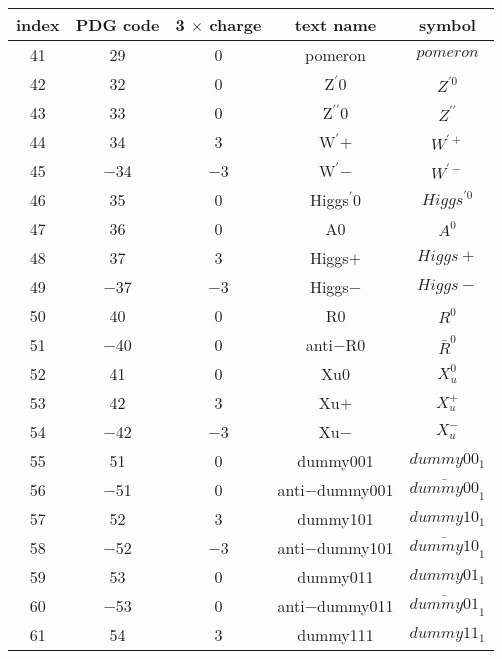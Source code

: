 \documentclass{article}
\begin{document}
\begin{table}[!htbp]
\centering
\begin{tabular}{|c|c|c|c|c|}
\hline
index & PDG code & 3 $\times$ charge & text name & symbol \\
\hline
41 & 29 & 0 & pomeron & $pomeron$ \\
\hline
42 & 32 & 0 & Z$^{\prime}$0 & $Z^{\prime0}$ \\
\hline
43 & 33 & 0 & Z$^{\prime\prime}$0 & $Z^{\prime\prime}$ \\
\hline
44 & 34 & 3 & W$^{\prime}$$+$ & $W^{\prime+}$ \\
\hline
45 & $-$34 & $-$3 & W$^{\prime}$$-$ & $W^{\prime-}$ \\
\hline
46 & 35 & 0 & Higgs$^{\prime}$0 & $Higgs^{\prime0}$ \\
\hline
47 & 36 & 0 & A0 & $A^{0}$ \\
\hline
48 & 37 & 3 & Higgs$+$ & $Higgs+$ \\
\hline
49 & $-$37 & $-$3 & Higgs$-$ & $Higgs-$ \\
\hline
50 & 40 & 0 & R0 & $R^{0}$ \\
\hline
51 & $-$40 & 0 & anti$-$R0 & $\bar{R}^{0}$ \\
\hline
52 & 41 & 0 & Xu0 & $X_{u}^{0}$ \\
\hline
53 & 42 & 3 & Xu$+$ & $X_{u}^{+}$ \\
\hline
54 & $-$42 & $-$3 & Xu$-$ & $X_{u}^{-}$ \\
\hline
55 & 51 & 0 & dummy00\underline{\hspace{0.6em}}1 & $dummy00_{1}$ \\
\hline
56 & $-$51 & 0 & anti$-$dummy00\underline{\hspace{0.6em}}1 & $\bar{dummy00}_{1}$ \\
\hline
57 & 52 & 3 & dummy10\underline{\hspace{0.6em}}1 & $dummy10_{1}$ \\
\hline
58 & $-$52 & $-$3 & anti$-$dummy10\underline{\hspace{0.6em}}1 & $\bar{dummy10}_{1}$ \\
\hline
59 & 53 & 0 & dummy01\underline{\hspace{0.6em}}1 & $dummy01_{1}$ \\
\hline
60 & $-$53 & 0 & anti$-$dummy01\underline{\hspace{0.6em}}1 & $\bar{dummy01}_{1}$ \\
\hline
61 & 54 & 3 & dummy11\underline{\hspace{0.6em}}1 & $dummy11_{1}$ \\

\end{tabular}
\end{table}
\end{document}
